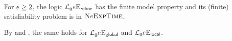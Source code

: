 \begin{proposition}
For $e \geq 2$, the logic $\mathcal{L}^{{}}_{0}{e}\mathrm{E}_{\mathsf{refine}}$ has the
finite model property and its (finite) satisfiability problem is in
$\text{\normalfont{\scshape N}}e\text{\normalfont{\scshape ExpTime}}$.

By  and , the same
holds for $\mathcal{L}^{{}}_{0}{e}\mathrm{E}_{\mathsf{global}}$ and
$\mathcal{L}^{{}}_{0}{e}\mathrm{E}_{\mathsf{local}}$.
\end{proposition}
